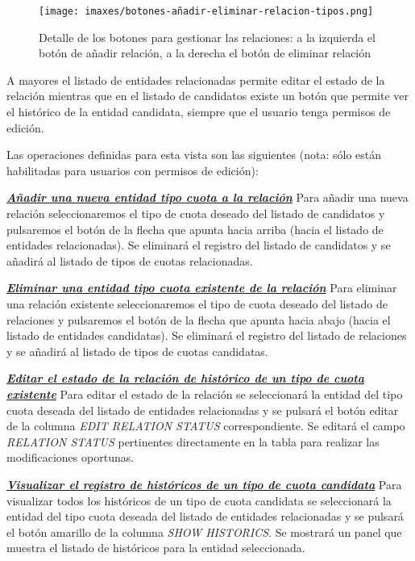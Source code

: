\begin{figure}[H]
  \centering
  \texttt{[image: imaxes/botones-añadir-eliminar-relacion-tipos.png]}
  \caption{Detalle de los botones para gestionar las relaciones: a la izquierda el botón de añadir relación, a la derecha el botón de eliminar relación}
  \label{fig:botones-añadir-eliminar-relacion-tipos}
\end{figure}

A mayores el listado de entidades relacionadas permite editar el estado de la relación mientras que en el listado de candidatos existe un botón que permite ver el histórico de la entidad candidata, siempre que el usuario tenga permisos de edición.



Las operaciones definidas para esta vista son las siguientes (nota: sólo están habilitadas para usuarios con permisos de edición):

\underline{\textsl{\textbf{Añadir una nueva entidad tipo cuota a la relación}}} \newline
Para añadir una nueva relación seleccionaremos el tipo de cuota deseado del listado de candidatos y pulsaremos el botón de la flecha que apunta hacia arriba (hacia el listado de entidades relacionadas). Se eliminará el registro del listado de candidatos y se añadirá al listado de tipos de cuotas relacionadas.


\underline{\textsl{\textbf{Eliminar una entidad tipo cuota existente de la relación}}}\newline
Para eliminar una relación existente seleccionaremos el tipo de cuota deseado del listado de relaciones y pulsaremos el botón de la flecha que apunta hacia abajo (hacia el listado de entidades candidatas). Se eliminará el registro del listado de relaciones y se añadirá al listado de tipos de cuotas candidatas.


\underline{\textsl{\textbf{Editar el estado de la relación de histórico de un tipo de cuota existente}}}
Para editar el estado de la relación se seleccionará la entidad del tipo cuota deseada del listado de entidades relacionadas y se pulsará el botón editar de la columna \textit{EDIT RELATION STATUS} correspondiente. Se editará el campo \emph{RELATION STATUS}  pertinentes directamente en la tabla para realizar las modificaciones oportunas.

\underline{\textsl{\textbf{Visualizar el registro de históricos de un tipo de cuota candidata}}}
Para visualizar todos los históricos de un tipo de cuota candidata se seleccionará la entidad del tipo cuota deseada del listado de entidades relacionadas y se pulsará el botón amarillo de la columna \textit{SHOW HISTORICS}. Se mostrará un panel que muestra el listado de históricos para la entidad seleccionada. 



